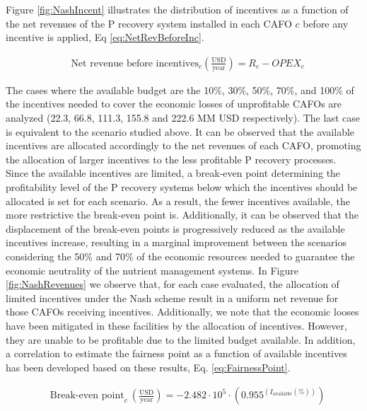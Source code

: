 \begin{refsection}[referencesCh5]
Figure \ref{fig:NashIncent} illustrates the distribution of incentives as a function of the net revenues of the P recovery system installed in each CAFO $c$ before any incentive is applied, Eq \ref{eq:NetRevBeforeInc}.

\begin{align}
& \text{Net revenue before incentives}_{c} \left(\frac{\text{USD}}{\text{year}}\right) = R_{c} - OPEX_{c} \label{eq:NetRevBeforeInc}
\end{align}

The cases where the available budget are the 10\%, 30\%, 50\%, 70\%, and 100\% of the incentives needed to cover the economic losses of unprofitable CAFOs are analyzed (22.3, 66.8, 111.3, 155.8 and 222.6 MM USD respectively). The last case is equivalent to the scenario studied above. It can be observed that the available incentives are allocated accordingly to the net revenues of each CAFO, promoting the allocation of larger incentives to the less profitable P recovery processes. Since the available incentives are limited, a break-even point determining the profitability level of the P recovery systems below which the incentives should be allocated is set for each scenario. As a result, the fewer incentives available, the more restrictive the break-even point is. Additionally, it can be observed that the displacement of the break-even points is progressively reduced as the available incentives increase, resulting in a marginal improvement between the scenarios considering the 50\% and 70\% of the economic resources needed to guarantee the economic neutrality of the nutrient management systems. In Figure \ref{fig:NashRevenues} we observe that, for each case evaluated, the allocation of limited incentives under the Nash scheme result in a uniform net revenue for those CAFOs receiving incentives. Additionally, we note that the economic looses have been mitigated in these facilities by the allocation of incentives. However, they are unable to be profitable due to the limited budget available. In addition, a correlation to estimate the fairness point as a function of available incentives has been developed based on these results, Eq. \ref{eq:FairnessPoint}.

\begin{align}
& \text{Break-even point}_c \ \left(\frac{\text{USD}}{\text{year}}\right) = -2.482\cdot10^{5} \cdot \left(0.955^{\left(I_{\text{available}}\left( \% \right) \right)}\right) \label{eq:FairnessPoint}
\end{align}


\end{refsection}
